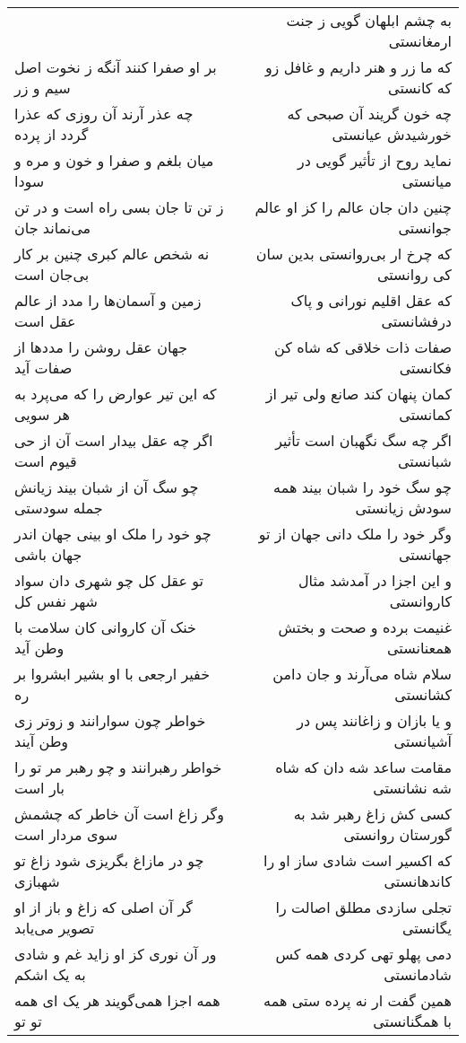 \begin{center}
\begin{longtable}{l p{0.5cm} r}
&&
به چشم ابلهان گویی ز جنت ارمغانستی
\\
بر او صفرا کنند آنگه ز نخوت اصل سیم و زر
&&
که ما زر و هنر داریم و غافل زو که کانستی
\\
چه عذر آرند آن روزی که عذرا گردد از پرده
&&
چه خون گریند آن صبحی که خورشیدش عیانستی
\\
میان بلغم و صفرا و خون و مره و سودا
&&
نماید روح از تأثیر گویی در میانستی
\\
ز تن تا جان بسی راه است و در تن می‌نماند جان
&&
چنین دان جان عالم را کز او عالم جوانستی
\\
نه شخص عالم کبری چنین بر کار بی‌جان است
&&
که چرخ ار بی‌روانستی بدین سان کی روانستی
\\
زمین و آسمان‌ها را مدد از عالم عقل است
&&
که عقل اقلیم نورانی و پاک درفشانستی
\\
جهان عقل روشن را مددها از صفات آید
&&
صفات ذات خلاقی که شاه کن فکانستی
\\
که این تیر عوارض را که می‌پرد به هر سویی
&&
کمان پنهان کند صانع ولی تیر از کمانستی
\\
اگر چه عقل بیدار است آن از حی قیوم است
&&
اگر چه سگ نگهبان است تأثیر شبانستی
\\
چو سگ آن از شبان بیند زیانش جمله سودستی
&&
چو سگ خود را شبان بیند همه سودش زیانستی
\\
چو خود را ملک او بینی جهان اندر جهان باشی
&&
وگر خود را ملک دانی جهان از تو جهانستی
\\
تو عقل کل چو شهری دان سواد شهر نفس کل
&&
و این اجزا در آمدشد مثال کاروانستی
\\
خنک آن کاروانی کان سلامت با وطن آید
&&
غنیمت برده و صحت و بختش همعنانستی
\\
خفیر ارجعی با او بشیر ابشروا بر ره
&&
سلام شاه می‌آرند و جان دامن کشانستی
\\
خواطر چون سوارانند و زوتر زی وطن آیند
&&
و یا بازان و زاغانند پس در آشیانستی
\\
خواطر رهبرانند و چو رهبر مر تو را بار است
&&
مقامت ساعد شه دان که شاه شه نشانستی
\\
وگر زاغ است آن خاطر که چشمش سوی مردار است
&&
کسی کش زاغ رهبر شد به گورستان روانستی
\\
چو در مازاغ بگریزی شود زاغ تو شهبازی
&&
که اکسیر است شادی ساز او را کاندهانستی
\\
گر آن اصلی که زاغ و باز از او تصویر می‌یابد
&&
تجلی سازدی مطلق اصالت را یگانستی
\\
ور آن نوری کز او زاید غم و شادی به یک اشکم
&&
دمی پهلو تهی کردی همه کس شادمانستی
\\
همه اجزا همی‌گویند هر یک ای همه تو تو
&&
همین گفت ار نه پرده ستی همه با همگنانستی

\end{longtable}
\end{center}
